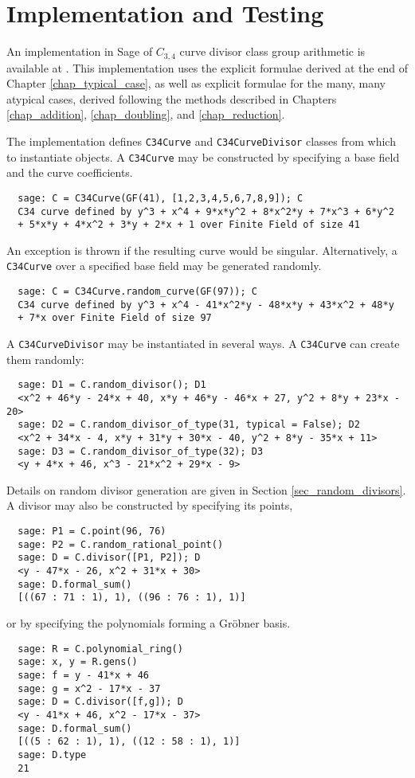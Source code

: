 
\section{Implementation and Testing}
\label{chap_implementation}

An implementation in Sage of $C_{3,4}$ curve divisor class group arithmetic
is available at \cite{github}.
This implementation uses the explicit formulae derived at the end of Chapter \ref{chap_typical_case},
as well as explicit formulae for the many, many atypical cases,
derived following the methods described in
Chapters \ref{chap_addition}, \ref{chap_doubling}, and \ref{chap_reduction}.

The implementation defines {\tt C34Curve} and {\tt C34CurveDivisor} classes from which to instantiate objects.
A {\tt C34Curve} may be constructed by specifying a base field and the curve coefficients.
\begin{verbatim}
  sage: C = C34Curve(GF(41), [1,2,3,4,5,6,7,8,9]); C
  C34 curve defined by y^3 + x^4 + 9*x*y^2 + 8*x^2*y + 7*x^3 + 6*y^2
  + 5*x*y + 4*x^2 + 3*y + 2*x + 1 over Finite Field of size 41
\end{verbatim}
An exception is thrown if the resulting curve would be singular.
Alternatively, a {\tt C34Curve} over a specified base field may be generated randomly.
\begin{verbatim}
  sage: C = C34Curve.random_curve(GF(97)); C
  C34 curve defined by y^3 + x^4 - 41*x^2*y - 48*x*y + 43*x^2 + 48*y
  + 7*x over Finite Field of size 97
\end{verbatim}

A {\tt C34CurveDivisor} may be instantiated in several ways.
A {\tt C34Curve} can create them randomly:
\begin{verbatim}
  sage: D1 = C.random_divisor(); D1
  <x^2 + 46*y - 24*x + 40, x*y + 46*y - 46*x + 27, y^2 + 8*y + 23*x - 20>
  sage: D2 = C.random_divisor_of_type(31, typical = False); D2
  <x^2 + 34*x - 4, x*y + 31*y + 30*x - 40, y^2 + 8*y - 35*x + 11>
  sage: D3 = C.random_divisor_of_type(32); D3
  <y + 4*x + 46, x^3 - 21*x^2 + 29*x - 9>
\end{verbatim}
Details on random divisor generation are given in Section \ref{sec_random_divisors}.
A divisor may also be constructed by specifying its points,
\begin{verbatim}
  sage: P1 = C.point(96, 76)
  sage: P2 = C.random_rational_point()
  sage: D = C.divisor([P1, P2]); D
  <y - 47*x - 26, x^2 + 31*x + 30>
  sage: D.formal_sum()
  [((67 : 71 : 1), 1), ((96 : 76 : 1), 1)]
\end{verbatim}
or by specifying the polynomials forming a Gr\"obner basis.
\begin{verbatim}
  sage: R = C.polynomial_ring()
  sage: x, y = R.gens()
  sage: f = y - 41*x + 46
  sage: g = x^2 - 17*x - 37
  sage: D = C.divisor([f,g]); D
  <y - 41*x + 46, x^2 - 17*x - 37>
  sage: D.formal_sum()
  [((5 : 62 : 1), 1), ((12 : 58 : 1), 1)]
  sage: D.type
  21
\end{verbatim}

